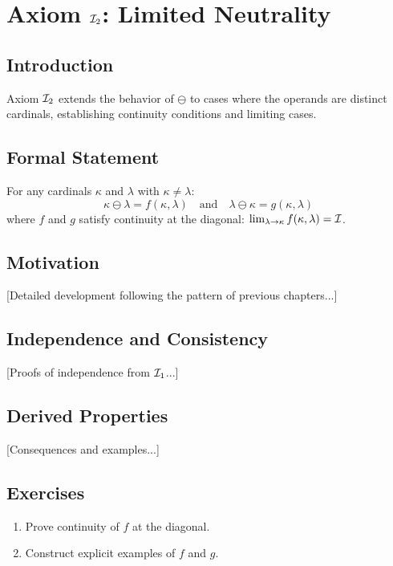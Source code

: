 \chapter{Axiom $\mathcal{I}_2$: Limited Neutrality}
\label{ch:axiom-I2}

\section{Introduction}
Axiom $\mathcal{I}_2$ extends the behavior of $\ominus$ to cases where the operands are distinct cardinals, establishing continuity conditions and limiting cases.

\section{Formal Statement}
\begin{axiom}
For any cardinals $\kappa$ and $\lambda$ with $\kappa \neq \lambda$:
\[
\kappa \ominus \lambda = f(\kappa, \lambda) \quad \text{and} \quad \lambda \ominus \kappa = g(\kappa, \lambda)
\]
where $f$ and $g$ satisfy continuity at the diagonal: $\lim_{\lambda \to \kappa} f(\kappa, \lambda) = \mathcal{I}$.
\end{axiom}

\section{Motivation}
[Detailed development following the pattern of previous chapters...]

\section{Independence and Consistency}
[Proofs of independence from $\mathcal{I}_1$...]

\section{Derived Properties}
[Consequences and examples...]

\section{Exercises}
\begin{enumerate}
\item Prove continuity of $f$ at the diagonal.
\item Construct explicit examples of $f$ and $g$.
\end{enumerate}
